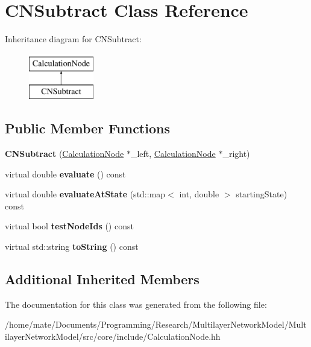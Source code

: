 \hypertarget{classCNSubtract}{}\section{C\+N\+Subtract Class Reference}
\label{classCNSubtract}
Inheritance diagram for C\+N\+Subtract\+:\begin{figure}[H]
\begin{center}
\leavevmode
\includegraphics[height=2.000000cm]{classCNSubtract}
\end{center}
\end{figure}
\subsection*{Public Member Functions}
\begin{DoxyCompactItemize}
\item 
{\bfseries C\+N\+Subtract} (\hyperlink{classCalculationNode}{Calculation\+Node} $\ast$\+\_\+left, \hyperlink{classCalculationNode}{Calculation\+Node} $\ast$\+\_\+right)\hypertarget{classCNSubtract_ab72c2b6679137655582d2001ac420dbf}{}\label{classCNSubtract_ab72c2b6679137655582d2001ac420dbf}

\item 
virtual double {\bfseries evaluate} () const \hypertarget{classCNSubtract_ae57879411a77bf2a5b16f28aa488a3d6}{}\label{classCNSubtract_ae57879411a77bf2a5b16f28aa488a3d6}

\item 
virtual double {\bfseries evaluate\+At\+State} (std\+::map$<$ int, double $>$ starting\+State) const \hypertarget{classCNSubtract_aa1d22fea2c4d0cdd26e64725d2be5205}{}\label{classCNSubtract_aa1d22fea2c4d0cdd26e64725d2be5205}

\item 
virtual bool {\bfseries test\+Node\+Ids} () const \hypertarget{classCNSubtract_a83d03d12f8b0b209c78dda0d783453e1}{}\label{classCNSubtract_a83d03d12f8b0b209c78dda0d783453e1}

\item 
virtual std\+::string {\bfseries to\+String} () const \hypertarget{classCNSubtract_a19ed00fcb52d52d40d97ed79a62e6dcd}{}\label{classCNSubtract_a19ed00fcb52d52d40d97ed79a62e6dcd}

\end{DoxyCompactItemize}
\subsection*{Additional Inherited Members}


The documentation for this class was generated from the following file\+:\begin{DoxyCompactItemize}
\item 
/home/mate/\+Documents/\+Programming/\+Research/\+Multilayer\+Network\+Model/\+Multilayer\+Network\+Model/src/core/include/Calculation\+Node.\+hh\end{DoxyCompactItemize}
